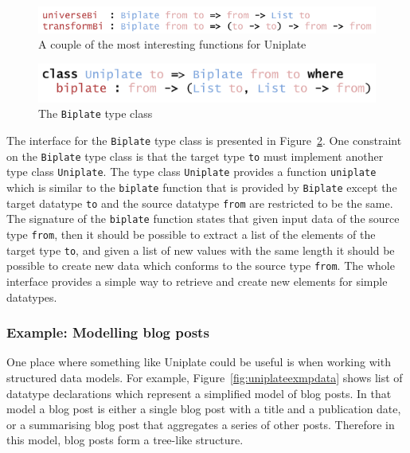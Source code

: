 \documentclass{ituthesis}
\newcommand{\tttype}[1]{\textcolor{type-color}{\texttt{#1}}}
\newcommand{\ttdec}[1]{\textcolor{declared-var-color}{\texttt{#1}}}
\newcommand{\ttvar}[1]{\textcolor{local-var-color}{\texttt{#1}}}
\theoremstyle{break}
\begin{document}
\begin{figure}[ht]
\begin{center}
    \includegraphics[scale=0.5]{Figures/UniplateFunctions.png}
\end{center}
\caption{A couple of the most interesting functions for Uniplate}
\label{fig:uniplatefunc}
\end{figure}

\begin{figure}[ht]
\begin{center}
    \includegraphics[scale=0.5]{Figures/UniplateClass.png}
\end{center}
\caption{The \tttype{Biplate} type class}
\label{fig:uniplateclass}
\end{figure}

The interface for the \tttype{Biplate} type class is presented in Figure~\ref{fig:uniplateclass}.
One constraint on the \tttype{Biplate} type class is that the target type \ttvar{to} must implement another type class \tttype{Uniplate}.
The type class \tttype{Uniplate} provides a function \ttdec{uniplate} which is similar to the \ttdec{biplate} function that is provided by \tttype{Biplate}
except the target datatype \ttvar{to} and the source datatype \ttvar{from} are restricted to be the same.
The signature of the \ttdec{biplate} function states that given input data of the source type \ttvar{from},
then it should be possible to extract a list of the elements of the target type \ttvar{to}, and given a list of new values with the same length it should be possible to create new data which conforms to the source type \ttvar{from}.
The whole interface provides a simple way to retrieve and create new elements for simple datatypes.

\subsubsection{Example: Modelling blog posts}
\label{ssub:Example: Modelling blog posts}
One place where something like Uniplate could be useful is when working with structured data models.
For example, Figure~\ref{fig:uniplateexmpdata} shows list of datatype declarations which represent a simplified model of blog posts.
In that model a blog post is either a single blog post with a title and a publication date, or a summarising blog post that aggregates a series of other posts.
Therefore in this model, blog posts form a tree-like structure.
\end{document}
